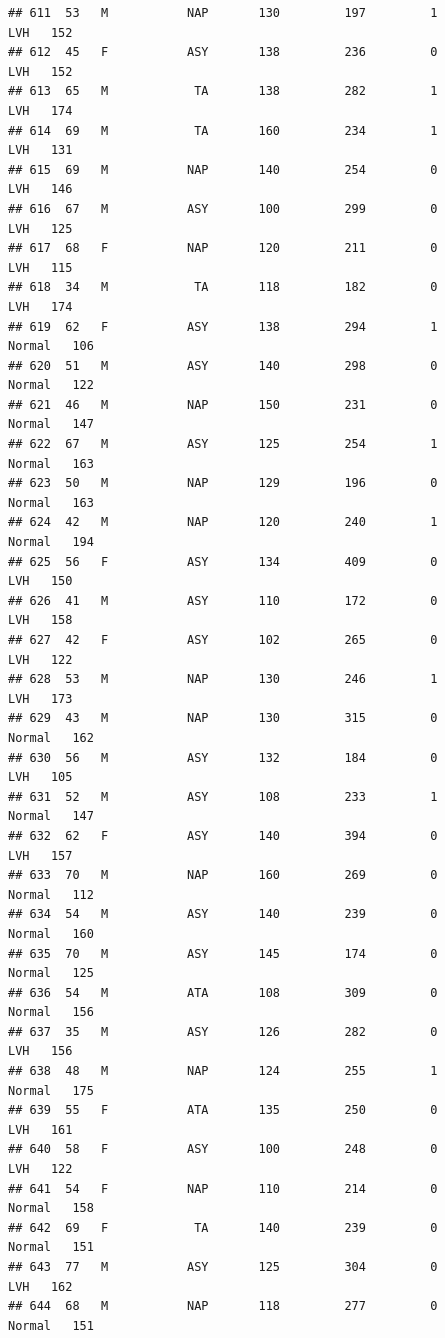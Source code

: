 \documentclass[
]{article}
\begin{document}
\begin{verbatim}
## 611  53   M           NAP       130         197         1        LVH   152
## 612  45   F           ASY       138         236         0        LVH   152
## 613  65   M            TA       138         282         1        LVH   174
## 614  69   M            TA       160         234         1        LVH   131
## 615  69   M           NAP       140         254         0        LVH   146
## 616  67   M           ASY       100         299         0        LVH   125
## 617  68   F           NAP       120         211         0        LVH   115
## 618  34   M            TA       118         182         0        LVH   174
## 619  62   F           ASY       138         294         1     Normal   106
## 620  51   M           ASY       140         298         0     Normal   122
## 621  46   M           NAP       150         231         0     Normal   147
## 622  67   M           ASY       125         254         1     Normal   163
## 623  50   M           NAP       129         196         0     Normal   163
## 624  42   M           NAP       120         240         1     Normal   194
## 625  56   F           ASY       134         409         0        LVH   150
## 626  41   M           ASY       110         172         0        LVH   158
## 627  42   F           ASY       102         265         0        LVH   122
## 628  53   M           NAP       130         246         1        LVH   173
## 629  43   M           NAP       130         315         0     Normal   162
## 630  56   M           ASY       132         184         0        LVH   105
## 631  52   M           ASY       108         233         1     Normal   147
## 632  62   F           ASY       140         394         0        LVH   157
## 633  70   M           NAP       160         269         0     Normal   112
## 634  54   M           ASY       140         239         0     Normal   160
## 635  70   M           ASY       145         174         0     Normal   125
## 636  54   M           ATA       108         309         0     Normal   156
## 637  35   M           ASY       126         282         0        LVH   156
## 638  48   M           NAP       124         255         1     Normal   175
## 639  55   F           ATA       135         250         0        LVH   161
## 640  58   F           ASY       100         248         0        LVH   122
## 641  54   F           NAP       110         214         0     Normal   158
## 642  69   F            TA       140         239         0     Normal   151
## 643  77   M           ASY       125         304         0        LVH   162
## 644  68   M           NAP       118         277         0     Normal   151

\end{verbatim}
\end{document}
